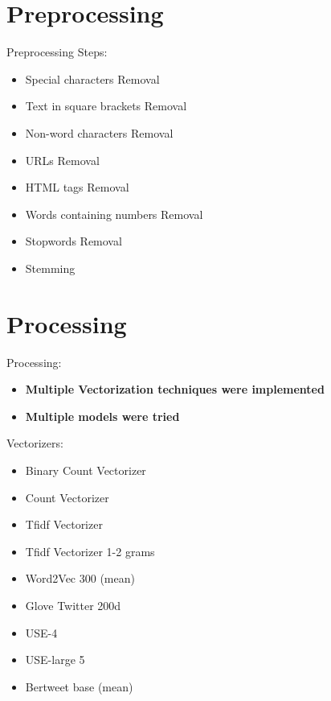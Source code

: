 \documentclass[12pt]{beamer}
\begin{document}
\section{Preprocessing}

\begin{frame}{Preprocessing Steps:}

\begin{itemize}
 \item Special characters Removal
\item Text in square brackets Removal
\item Non-word characters Removal
\item URLs Removal
\item HTML tags Removal
\item Words containing numbers Removal
\item Stopwords Removal
\item Stemming
\end{itemize}
\end{frame}
\section{Processing}
\begin{frame}{Processing:}
\begin{itemize}
\item \textbf{Multiple Vectorization techniques were implemented}
\item \textbf{Multiple models were tried}

\end{itemize}

\end{frame}

\begin{frame}{Vectorizers:}
\begin{itemize}

\item Binary Count Vectorizer
\item Count Vectorizer
\item Tfidf Vectorizer
\item Tfidf Vectorizer 1-2 grams
\item Word2Vec 300 (mean)
\item Glove Twitter 200d
\item USE-4
\item USE-large 5
\item Bertweet base (mean)


\end{itemize}

\end{frame}
\end{document}
